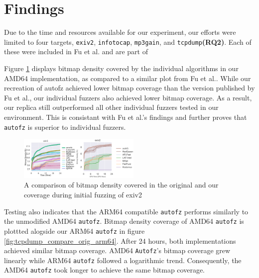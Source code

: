 \section{Findings}

Due to the time and resources available for our experiment, our efforts were limited 
to four targets, \texttt{exiv2}, \texttt{infotocap}, \texttt{mp3gain}, and 
\texttt{tcpdump}\textbf{(RQ2)}. Each of these were included in Fu et al.\cite{fu_autofz_2023} 
and are part of

Figure \ref{fig:exiv2_compare_orig_arm64} displays bitmap density covered by the individual algorithms in our AMD64 implementation, 
as compared to a similar plot from Fu et al.\cite{fu_autofz_2023}. While our recreation of autofz achieved lower bitmap coverage than 
the version published by Fu et al., our individual fuzzers also achieved lower bitmap coverage. As a result, our replica still 
outperformed all other individual fuzzers tested in our environment. This is consistant
with Fu et al.'s findings and further proves that \texttt{autofz} is superior to individual fuzzers.

\begin{figure}
    \includegraphics[width=0.52\textwidth]{figs/exiv2_compare_orig_arm64.png}
    \centering
    \caption{A comparison of bitmap density covered in the original\cite{fu_autofz_2023} and our 
    coverage during initial fuzzing of exiv2}
    \label{fig:exiv2_compare_orig_arm64}
\end{figure}

Testing also indicates that the ARM64 compatible \texttt{autofz} performs similarly to the unmodified AMD64 \texttt{autofz}. 
Bitmap density coverage of AMD64 \texttt{autofz} is plottted alogside our ARM64 \texttt{autofz} in figure 
\ref{fig:tcpdump_compare_orig_arm64}. After 24 hours, both implementations achieved similar bitmap coverage.
AMD64 \texttt{Autofz}'s bitmap coverage grew linearly while ARM64 \texttt{autofz} followed a logarithmic trend. Consequently, 
the AMD64 \texttt{autofz} took longer to achieve the same bitmap coverage. 

